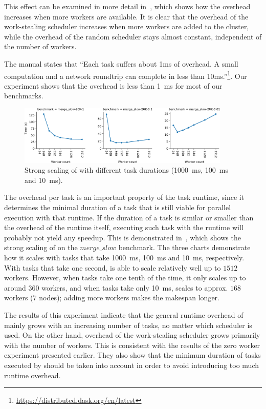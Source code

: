 This effect can be examined in more detail in~, which shows how the
overhead increases when more workers are available. It is clear that the overhead of the
work-stealing scheduler increases when more workers are added to the cluster, while the overhead of
the random scheduler stays almost constant, independent of the number of workers.

The \dask{} manual states that ``Each task suffers about 1ms of overhead. A
small computation and a network roundtrip can complete in less than
10ms.''\footnote{\url{https://distributed.dask.org/en/latest}}. Our experiment shows that the overhead is less than
\SI{1}{\milli\second} for most of our benchmarks.

\begin{figure}
	\centering
	\includegraphics[width=0.9\textwidth]{imgs/rsds/charts/dask-strong-scaling}
	\caption{Strong scaling of \dask{} with different task durations
	(\SI{1000}{\milli\second}, \SI{100}{\milli\second} and \SI{10}{\milli\second}).}
	\label{fig:dask-strong-scaling}
\end{figure}

The overhead per task is an important property of the task runtime, since it determines the minimal
duration of a task that is still viable for parallel execution with that runtime. If the duration
of a task is similar or smaller than the overhead of the runtime itself, executing such task with
the runtime will probably not yield any speedup. This is demonstrated
in~, which shows the strong scaling of \dask{} on
the $merge\_slow$ benchmark. The three charts demonstrate how it scales with tasks
that take \SI{1000}{\milli\second}, \SI{100}{\milli\second} and \SI{10}{\milli\second},
respectively. With tasks that take one second, \dask{} is able to scale
relatively well up to $1512$ workers. However, when tasks take one tenth of the
time, it only scales up to around $360$ workers, and when tasks take only
\SI{10}{\milli\second}, \dask{} scales to approx.
$168$ workers ($7$ nodes); adding more workers makes
the makespan longer.

The results of this experiment indicate that the general runtime overhead of
\dask{} mainly grows with an increasing number of tasks, no matter which
scheduler is used. On the other hand, overhead of the work-stealing scheduler grows primarily with
the number of workers. This is consistent with the results of the zero worker experiment presented
earlier. They also show that the minimum duration of tasks executed by \dask{}
should be taken into account in order to avoid introducing too much runtime overhead.

